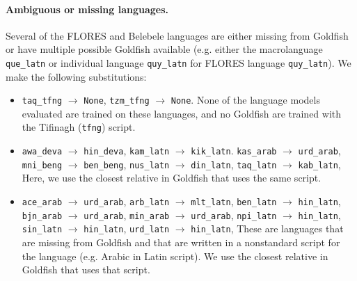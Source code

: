 \documentclass[11pt]{article}
\begin{document}
\paragraph{Ambiguous or missing languages.}
Several of the FLORES and Belebele languages are either missing from Goldfish or have multiple possible Goldfish available (e.g. either the macrolanguage \texttt{que\_latn} or individual language \texttt{quy\_latn} for FLORES language \texttt{quy\_latn}).
We make the following substitutions:
\begin{itemize}[leftmargin=0.5cm,itemsep=0.0cm,topsep=0.1cm]
\item \texttt{taq\_tfng} $\to$ \texttt{None}, \newline
\texttt{tzm\_tfng} $\to$ \texttt{None}. \newline
None of the language models evaluated are trained on these languages, and no Goldfish are trained with the Tifinagh (\texttt{tfng}) script.
\item 
\texttt{awa\_deva} $\to$ \texttt{hin\_deva}, \newline
\texttt{kam\_latn} $\to$ \texttt{kik\_latn}. \newline
\texttt{kas\_arab} $\to$ \texttt{urd\_arab}, \newline
\texttt{mni\_beng} $\to$ \texttt{ben\_beng}, \newline
\texttt{nus\_latn} $\to$ \texttt{din\_latn}, \newline
\texttt{taq\_latn} $\to$ \texttt{kab\_latn}, \newline
Here, we use the closest relative in Goldfish that uses the same script.
\item 
\texttt{ace\_arab} $\to$ \texttt{urd\_arab}, \newline
\texttt{arb\_latn} $\to$ \texttt{mlt\_latn}, \newline
\texttt{ben\_latn} $\to$ \texttt{hin\_latn}, \newline
\texttt{bjn\_arab} $\to$ \texttt{urd\_arab}, \newline
\texttt{min\_arab} $\to$ \texttt{urd\_arab}, \newline
\texttt{npi\_latn} $\to$ \texttt{hin\_latn}, \newline
\texttt{sin\_latn} $\to$ \texttt{hin\_latn}, \newline
\texttt{urd\_latn} $\to$ \texttt{hin\_latn}, \newline
These are languages that are missing from Goldfish and that are written in a nonstandard script for the language (e.g. Arabic in Latin script). We use the closest relative in Goldfish that uses that script.

\end{itemize}
\end{document}
